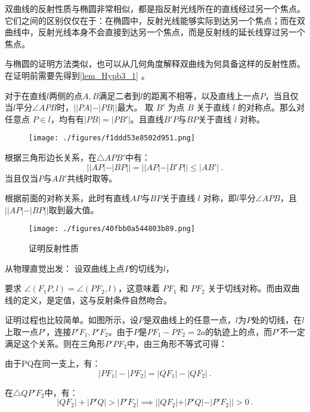 双曲线的反射性质与椭圆非常相似，都是指反射光线所在的直线经过另一个焦点。它们之间的区别仅仅在于：在椭圆中，反射光线能够实际到达另一个焦点；而在双曲线中，反射光线本身不会直接到达另一个焦点，而是反射线的延长线穿过另一个焦点。

与椭圆的证明方法类似，也可以从几何角度解释双曲线为何具备这样的反射性质。在证明前需要先得到\autoref{lem_Hypb3_1} 。

\begin{lemma}{对于在直线$l$两侧的点$A,B$满足二者到$l$的距离不相等，以及直线上一点$P$，当且仅当$l$平分$\angle APB$时，$||PA|-|PB||$最大。}\label{lem_Hypb3_1}
取 $B'$ 为点 $B$ 关于直线 $l$ 的对称点。那么对任意点 $P\in l$，均有有$|PB| = |PB'|$。且直线$B'P$与$BP$关于直线 $l$ 对称。
\begin{figure}[ht]
\centering
\texttt{[image: ./figures/f1ddd53e8502d951.png]}
\caption{} \label{fig_Hypb3_10}
\end{figure}
根据三角形边长关系，在$\triangle APB'$中有：
\begin{equation}
||AP|-|BP||=||AP|-|B'P||\leq|AB'|~.
\end{equation}
当且仅当$P$与$AB'$共线时取等。

根据前面的对称关系，此时有直线$AP$与$BP$关于直线 $l$ 对称，即$l$平分$\angle APB$，且$||AP|-|BP||$取到最大值。
\end{lemma}

\begin{figure}[ht]
\centering
\texttt{[image: ./figures/40fbb0a544803b89.png]}
\caption{证明反射性质} \label{fig_Hypb3_11}
\end{figure}

从物理直觉出发：
设双曲线上点$P$的切线为$l$，

要求 $\angle (F_1P, l) = \angle (PF_2, l)$，这意味着 $PF_1$ 和 $PF_2$ 关于切线对称。而由双曲线的定义，是定值，这与反射条件自然吻合。

证明过程也比较简单。如图所示，设$P$是双曲线上的任意一点，$l$为$P$处的切线，在$l$上取一点$P'$，连接$P'F_1,P'F_2$。由于$P$是$PF_1-PF_2=2a$的轨迹上的点，而$P'$不一定满足这个关系。则在三角形$P'PF_2$中，由三角形不等式可得：

由于PQ在同一支上，有：
\begin{equation}
|PF_1| - |PF_2|=|QF_1| - |QF_2|~.
\end{equation}

在$\triangle QP'F_2$中，有：
\begin{equation}
|QF_2|+|P'Q|>|P'F_2|\implies||QF_2|+|P'Q|-|P'F_2||>0~.
\end{equation}

